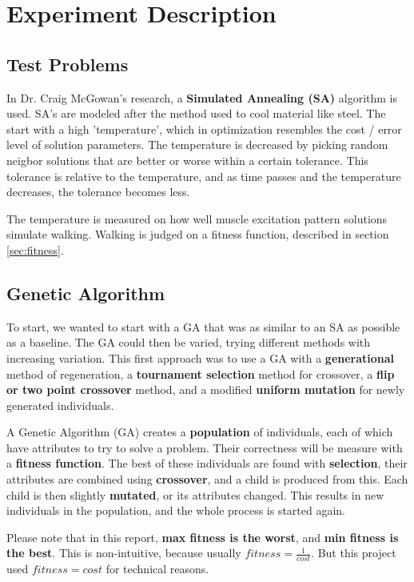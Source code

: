 \section{Experiment Description}

\subsection{Test Problems}
In Dr. Craig McGowan's research, a \textbf{Simulated Annealing (SA)} algorithm
is used. SA's are modeled after the method used to cool material like steel.
The start with a high 'temperature', which in optimization resembles the cost / 
error level of solution parameters. The temperature is decreased by picking 
random neigbor solutions that are better or worse within a certain tolerance.
This tolerance is relative to the temperature, and as time passes and the 
temperature decreases, the tolerance becomes less.

The temperature is measured on how well muscle excitation pattern solutions
simulate walking. Walking is judged on a fitness function, described in 
section \ref{sec:fitness}.

\subsection{Genetic Algorithm}
To start, we wanted to start with a GA that was as similar to an SA as possible
as a baseline. The GA could then be varied, trying different methods with 
increasing variation. This first approach was to use a GA with a 
\textbf{generational} method of regeneration, a \textbf{tournament selection} 
method for crossover, a \textbf{flip or two point crossover} method, and a 
modified 
\textbf{uniform mutation} for newly generated individuals.

A Genetic Algorithm (GA) creates a \textbf{population} of individuals, each of which have attributes to try to solve a problem. Their correctness will be measure with a \textbf{fitness function}. The best of these individuals are found with \textbf{selection}, their attributes are combined using \textbf{crossover}, and a child is produced from this. Each child is then slightly \textbf{mutated}, or its attributes changed. This results in new individuals in the population, and the whole process is started again.

Please note that in this report, \textbf{max fitness is the worst}, and 
\textbf{min fitness is the best}. This is non-intuitive, because usually 
$ fitness = \frac{1}{cost} $. But this project used $ fitness = cost $ for 
technical reasons.

